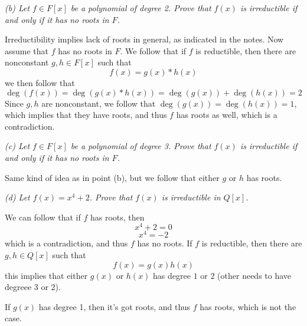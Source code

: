 \documentclass[11pt,oneside,titlepage]{book}
\begin{document}
\textit{(b) Let $f \in F[x]$ be a polynomial of degree 2. Prove that
$f(x)$ is irreductible if and only if it has no roots in $F$.}

Irreductibility implies lack of roots in general, as indicated in the
notes. Now assume that $f$ has no roots in $F$. We follow that if $f$
is reductible, then there are nonconstant $g, h \in F[x]$ such that
$$f(x) = g(x) * h(x)$$
we then follow that
$$\deg(f(x)) = \deg(g(x) * h(x)) = \deg(g(x)) + \deg(h(x)) = 2$$
Since $g, h$ are nonconstant, we follow that $\deg(g(x)) = \deg(h(x))
= 1$, which implies that they have roots, and thus $f$ has roots as
well, which is a contradiction.

\textit{(c) Let $f \in F[x]$ be a polynomial of degree 3. Prove that
$f(x)$ is irreductible if and only if it has no roots in $F$.}

Same kind of idea as in point (b), but we follow that either $g$ or
$h$ has roots.

\textit{(d) Let $f(x) = x^4 + 2$. Prove that $f(x)$ is irreductible in
$Q[x]$.}

We can follow that if $f$ has roots, then
$$x^4 + 2 = 0$$
$$x^4 = -2$$
which is a contradiction, and thus $f$ has no roots. If $f$ is
reductible, then there are $g, h \in Q[x]$ such that
$$f(x) = g(x) h(x)$$
this implies that either $g(x)$ or $h(x)$ has degree $1$ or $2$ (other
needs to have degreee 3 or 2).

If $g(x)$ has degree 1, then it's got roots, and thus $f$ has roots,
which is not the case.
\end{document}
